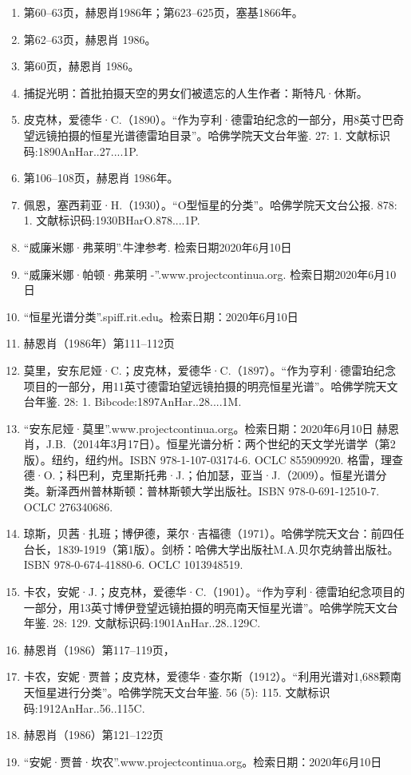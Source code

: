 \begin{enumerate}
\item 第60–63页，赫恩肖1986年；第623–625页，塞基1866年。
\item 第62–63页，赫恩肖 1986。
\item 第60页，赫恩肖 1986。
\item 捕捉光明：首批拍摄天空的男女们被遗忘的人生作者：斯特凡·休斯。
\item 皮克林，爱德华·C.（1890）。“作为亨利·德雷珀纪念的一部分，用8英寸巴奇望远镜拍摄的恒星光谱德雷珀目录”。哈佛学院天文台年鉴. 27: 1. 文献标识码:1890AnHar..27....1P.
\item 第106–108页，赫恩肖 1986年。
\item 佩恩，塞西莉亚·H.（1930）。“O型恒星的分类”。哈佛学院天文台公报. 878: 1. 文献标识码:1930BHarO.878....1P.
\item “威廉米娜·弗莱明”.牛津参考. 检索日期2020年6月10日
\item “威廉米娜·帕顿·弗莱明 -”.www.projectcontinua.org. 检索日期2020年6月10日
\item “恒星光谱分类”.spiff.rit.edu。检索日期：2020年6月10日
\item 赫恩肖（1986年）第111–112页
\item 莫里，安东尼娅·C.；皮克林，爱德华·C.（1897）。“作为亨利·德雷珀纪念项目的一部分，用11英寸德雷珀望远镜拍摄的明亮恒星光谱”。哈佛学院天文台年鉴. 28: 1. Bibcode:1897AnHar..28....1M.
\item “安东尼娅·莫里”.www.projectcontinua.org。检索日期：2020年6月10日
赫恩肖，J.B.（2014年3月17日）。恒星光谱分析：两个世纪的天文学光谱学（第2版）。纽约，纽约州。ISBN 978-1-107-03174-6. OCLC 855909920.
格雷，理查德·O.；科巴利，克里斯托弗·J.；伯加瑟，亚当·J.（2009）。恒星光谱分类。新泽西州普林斯顿：普林斯顿大学出版社。ISBN 978-0-691-12510-7. OCLC 276340686.
\item 琼斯，贝茜·扎班；博伊德，莱尔·吉福德（1971）。哈佛学院天文台：前四任台长，1839-1919（第1版）。剑桥：哈佛大学出版社M.A.贝尔克纳普出版社。ISBN 978-0-674-41880-6. OCLC 1013948519.
\item 卡农，安妮·J.；皮克林，爱德华·C.（1901）。“作为亨利·德雷珀纪念项目的一部分，用13英寸博伊登望远镜拍摄的明亮南天恒星光谱”。哈佛学院天文台年鉴. 28: 129. 文献标识码:1901AnHar..28..129C.
\item 赫恩肖（1986）第117–119页，
\item 卡农，安妮·贾普；皮克林，爱德华·查尔斯（1912）。“利用光谱对1,688颗南天恒星进行分类”。哈佛学院天文台年鉴. 56 (5): 115. 文献标识码:1912AnHar..56..115C.
\item 赫恩肖（1986）第121–122页
\item “安妮·贾普·坎农”.www.projectcontinua.org。检索日期：2020年6月10日

\end{enumerate}
